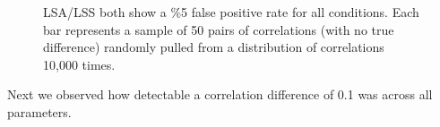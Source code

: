 \documentclass[10pt,letterpaper]{article}
\begin{document}
\begin{figure}[H]
  \centering


  \caption{
    LSA/LSS both show a \%5 false positive rate for all conditions.
    Each bar represents a sample of 50 pairs of correlations (with no true difference)
    randomly pulled from a distribution of correlations 10,000 times.
  }
  \label{fig:res_sim_fpr}
\end{figure}

Next we observed how detectable a correlation difference of 0.1 was
across all parameters.
\end{document}
